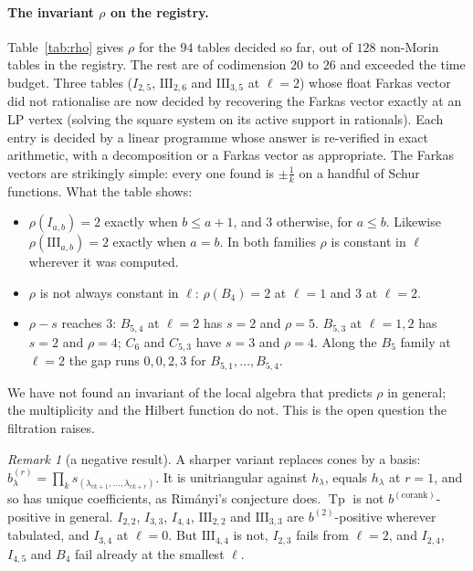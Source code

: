 \documentclass[11pt,a4paper]{article}
\DeclareMathOperator{\Tp}{Tp}
\theoremstyle{plain}
\theoremstyle{definition}
\theoremstyle{remark}
\newtheorem{remark}[theorem]{Remark}
\begin{document}
\paragraph{The invariant $\rho$ on the registry.}
Table~\ref{tab:rho} gives $\rho$ for the $94$ tables decided so far, out of $128$ non-Morin
tables in the registry. The rest are of codimension $20$ to $26$ and exceeded the time budget.
Three tables ($I_{2,5}$, $\mathrm{III}_{2,6}$ and $\mathrm{III}_{3,5}$ at $\ell = 2$) whose float
Farkas vector did not rationalise are now decided by recovering the Farkas vector exactly at an LP
vertex (solving the square system on its active support in rationals). Each entry is decided by a linear
programme whose answer is re-verified in exact arithmetic, with a decomposition or a Farkas vector
as appropriate. The Farkas vectors are strikingly simple: every one found is $\pm\frac1k$ on a
handful of Schur functions. What the table shows:
\begin{itemize}[nosep]
\item $\rho(I_{a,b}) = 2$ exactly when $b \le a+1$, and $3$ otherwise, for $a \le b$. Likewise
  $\rho(\mathrm{III}_{a,b}) = 2$ exactly when $a = b$. In both families $\rho$ is constant in
  $\ell$ wherever it was computed.
\item $\rho$ is not always constant in $\ell$: $\rho(B_4) = 2$ at $\ell = 1$ and $3$ at $\ell = 2$.
\item $\rho - s$ reaches $3$: $B_{5,4}$ at $\ell = 2$ has $s = 2$ and $\rho = 5$. $B_{5,3}$ at
  $\ell = 1, 2$ has $s = 2$ and $\rho = 4$; $C_6$ and $C_{5,3}$ have $s = 3$ and $\rho = 4$. Along the
  $B_5$ family at $\ell = 2$ the gap runs $0, 0, 2, 3$ for $B_{5,1}, \dots, B_{5,4}$.
\end{itemize}
We have not found an invariant of the local algebra that predicts $\rho$ in general; the
multiplicity and the Hilbert function do not. This is the open question the filtration raises.

\begin{remark}[a negative result]
A sharper variant replaces cones by a basis: $b^{(r)}_\lambda = \prod_k s_{(\lambda_{rk+1}, \dots,
\lambda_{rk+r})}$. It is unitriangular against $h_\lambda$, equals $h_\lambda$ at $r = 1$, and so
has unique coefficients, as Rim\'anyi's conjecture does. $\Tp$ is not $b^{(\mathrm{corank})}$-positive
in general. $I_{2,2}$, $I_{3,3}$, $I_{4,4}$, $\mathrm{III}_{2,2}$ and $\mathrm{III}_{3,3}$ are
$b^{(2)}$-positive wherever tabulated, and $I_{3,4}$ at $\ell = 0$. But $\mathrm{III}_{4,4}$ is not,
$I_{2,3}$ fails from $\ell = 2$, and $I_{2,4}$, $I_{4,5}$ and $B_4$ fail already at the smallest
$\ell$.
\end{remark}
\end{document}
